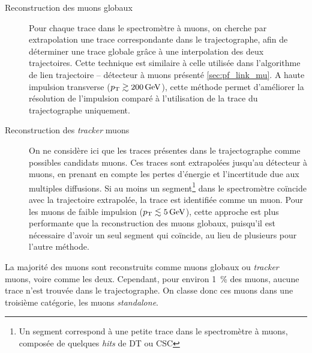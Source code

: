 \begin{description}
    \item[Reconstruction des muons globaux] Pour chaque trace dans le spectromètre à muons, on cherche par extrapolation une trace correspondante dans le trajectographe, afin de déterminer une trace globale grâce à une interpolation des deux trajectoires. Cette technique est similaire à celle utilisée dans l'algorithme de lien trajectoire -- détecteur à muons présenté \cref{sec:pf_link_mu}. A haute impulsion transverse ($\pt \gtrsim \SI{200}{\GeV}$), cette méthode permet d'améliorer la résolution de l'impulsion comparé à l'utilisation de la trace du trajectographe uniquement.
    \item[Reconstruction des \emph{tracker} muons] On ne considère ici que les traces présentes dans le trajectographe comme possibles candidats muons. Ces traces sont extrapolées jusqu'au détecteur à muons, en prenant en compte les pertes d'énergie et l'incertitude due aux multiples diffusions. Si au moins un segment\footnote{Un segment correspond à une petite trace dans le spectromètre à muons, composée de quelques \emph{hits} de DT ou CSC} dans le spectromètre coïncide avec la trajectoire extrapolée, la trace est identifiée comme un muon. Pour les muons de faible impulsion ($\pt \lesssim
 \SI{5}{\GeV}$), cette approche est plus performante que la reconstruction des muons globaux, puisqu'il est nécessaire d'avoir un seul segment qui coïncide, au lieu de plusieurs pour l'autre méthode.
\end{description}

La majorité des muons sont reconstruits comme muons globaux ou \emph{tracker} muons, voire comme les deux. Cependant, pour environ \SI{1}{\%} des muons, aucune trace n'est trouvée dans le trajectographe. On classe donc ces muons dans une troisième catégorie, les muons \emph{standalone}.

\medskip

